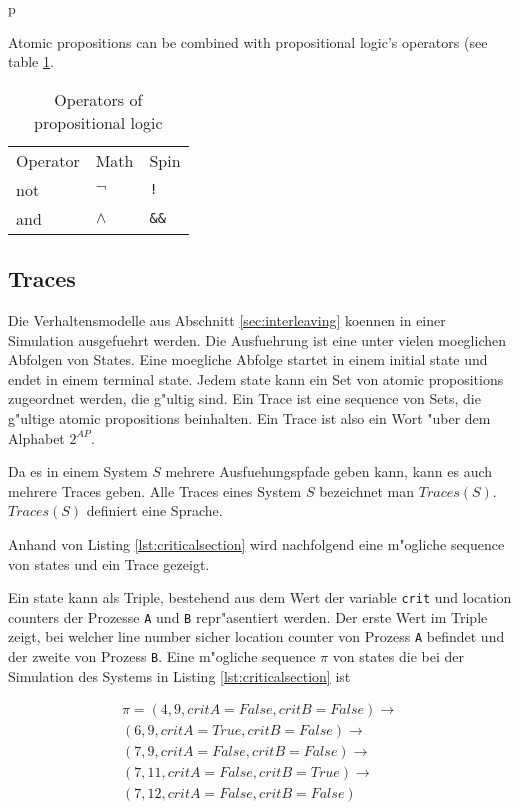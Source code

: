 p\documentclass[a4paper, twoside]{article}
\begin{document}
Atomic propositions can be combined with propositional logic's operators (see table \ref{tab:operators_of_propositionallogic}.

\begin{table}
  \centering

  \begin{tabular}{l l l}
    Operator & Math & Spin \\
    not & $\neg$ & \verb|!| \\
    and & $\land$ & \verb|&&| \\
  \end{tabular}
  \caption{Operators of propositional logic }
  \label{tab:operators_of_propositionallogic}
\end{table}

\subsection{Traces}
\label{sec:traces}

Die Verhaltensmodelle aus Abschnitt \ref{sec:interleaving} koennen in einer Simulation ausgefuehrt werden. Die Ausfuehrung ist eine unter vielen moeglichen Abfolgen von States. Eine moegliche Abfolge startet in einem initial state und endet in einem terminal state. Jedem state kann ein Set von atomic propositions zugeordnet werden, die g"ultig sind. Ein Trace ist eine sequence von Sets, die g"ultige atomic propositions beinhalten. Ein Trace ist also ein Wort "uber dem Alphabet $2^{AP}$.

Da es in einem System $S$ mehrere Ausfuehungspfade geben kann, kann es auch mehrere Traces geben. Alle Traces eines System $S$ bezeichnet man $Traces(S)$. $Traces(S)$ definiert eine Sprache.

Anhand von Listing \ref{lst:criticalsection} wird nachfolgend eine m"ogliche sequence von states und ein Trace gezeigt.



Ein state kann als Triple, bestehend aus dem Wert der variable \verb|crit| und location counters der Prozesse \verb|A| und \verb|B| repr"asentiert werden. Der erste Wert im Triple zeigt, bei welcher line number sicher location counter von Prozess \verb|A| befindet und der zweite von Prozess \verb|B|.
Eine m"ogliche sequence $\pi$ von states die bei der Simulation des Systems in Listing \ref{lst:criticalsection} ist

\begin{equation}
  \label{eq:path}
  \begin{split}
\pi = (4, 9, {critA}={False},{critB}=False) \rightarrow \\
(6, 9, {critA}={True},{critB}=False) \rightarrow \\
(7, 9, {critA}={False},{critB}=False) \rightarrow \\
(7, 11, {critA}={False},{critB}=True) \rightarrow \\
(7, 12, {critA}={False},{critB}=False)
  \end{split}
\end{equation}
\end{document}
